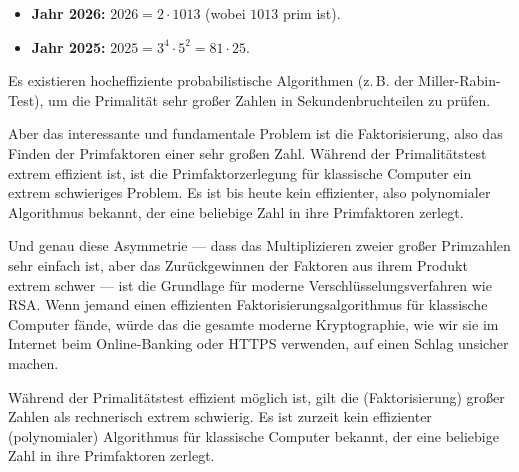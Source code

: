 \begin{math-stroke}
\begin{examples}
\begin{itemize}
    \item \textbf{Jahr 2026:} $2026 = 2 \cdot 1013$ (wobei $1013$ prim ist).
    \item \textbf{Jahr 2025:} $2025 = 3^4 \cdot 5^2 = 81 \cdot 25$.
\end{itemize}
\end{examples}

\begin{remark}
Es existieren hocheffiziente probabilistische Algorithmen (z.\,B. der Miller-Rabin-Test), um die Primalität sehr großer Zahlen in Sekundenbruchteilen zu prüfen.
\end{remark}
\end{math-stroke}

\begin{spoken-clean}[00:57:00 - 01:01:30]
Aber das interessante und fundamentale Problem ist die Faktorisierung, also das Finden der Primfaktoren einer sehr großen Zahl. Während der Primalitätstest extrem effizient ist, ist die Primfaktorzerlegung für klassische Computer ein extrem schwieriges Problem. Es ist bis heute kein effizienter, also polynomialer Algorithmus bekannt, der eine beliebige Zahl in ihre Primfaktoren zerlegt.

Und genau diese Asymmetrie --- dass das Multiplizieren zweier großer Primzahlen sehr einfach ist, aber das Zurückgewinnen der Faktoren aus ihrem Produkt extrem schwer --- ist die Grundlage für moderne Verschlüsselungsverfahren wie RSA. Wenn jemand einen effizienten Faktorisierungsalgorithmus für klassische Computer fände, würde das die gesamte moderne Kryptographie, wie wir sie im Internet beim Online-Banking oder HTTPS verwenden, auf einen Schlag unsicher machen.
\end{spoken-clean}

\begin{math-stroke}
\begin{remark}[Faktorisierungsproblem]
Während der Primalitätstest effizient möglich ist, gilt die  (Faktorisierung) großer Zahlen als rechnerisch extrem schwierig. Es ist zurzeit kein effizienter (polynomialer) Algorithmus für klassische Computer bekannt, der eine beliebige Zahl in ihre Primfaktoren zerlegt.
\end{remark}
\end{math-stroke}

